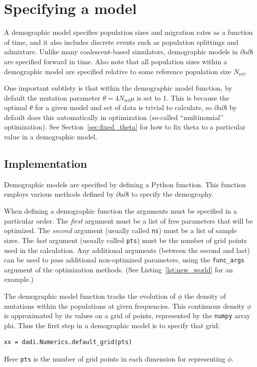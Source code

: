 \documentclass[12pt]{article}
\makeatletter
\newcommand{\dadi}{$\partial$a$\partial$i\xspace}
\newcommand{\Nref}{\ensuremath{N_\text{ref}}\xspace}
\newcommand{\py}[1]{\lstinline[language=Python, showstringspaces=False]@#1@}
\makeatother
\begin{document}
\section{Specifying a model}

A demographic model specifies population sizes and migration rates as a function of time, and it also includes discrete events such as population splittings and admixture.
Unlike many coalescent-based simulators, demographic models in \dadi are specified forward in time.
Also note that all population sizes within a demographic model are specified relative to some reference population size \Nref.

One important subtlety is that within the demographic model function, by default the mutation parameter $\theta = 4 \Nref \mu$ is set to 1.
This is because the optimal $\theta$ for a given model and set of data is trivial to calculate, so \dadi by default does this automatically in optimization (so-called ``multinomial'' optimization).
See Section~\ref{sec:fixed_theta} for how to fix theta to a particular value in a demographic model.

\subsection{Implementation}

Demographic models are specified by defining a Python function.
This function employs various methods defined by \dadi to specify the demography.

When defining a demographic function the arguments must be specified in a particular order.
The \emph{first} argument must be a list of free parameters that will be optimized.
The \emph{second} argument (usually called \py{ns}) must be a list of sample sizes.
The \emph{last} argument (usually called \py{pts}) must be the number of grid points used in the calculation.
Any additional arguments (between the second and last) can be used to pass additional non-optimized parameters, using the \py{func_args} argument of the optimization methods.
(See Listing~\ref{lst:new_world} for an example.)

The demographic model function tracks the evolution of $\phi$ the density of mutations within the populations at given frequencies.
This continuous density $\phi$ is approximated by its values on a grid of points, represented by the \py{numpy} array {phi}.
Thus the first step in a demographic model is to specify that grid:
\begin{lstlisting}
xx = dadi.Numerics.default_grid(pts)
\end{lstlisting}
Here \py{pts} is the number of grid points in each dimension for representing $\phi$.
\end{document}

